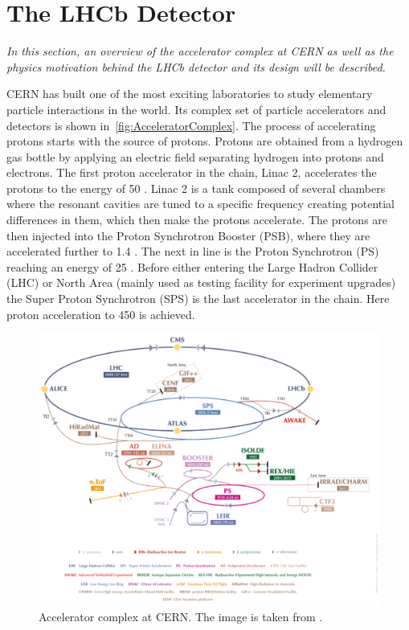 \chapter{The LHCb Detector}
\label{chap:dec}

\textit{In this section, an overview of the accelerator complex at CERN as well as the physics motivation behind the \Gls{LHCb} detector and its design will be described.}

CERN has built one of the most exciting laboratories to study elementary particle interactions in the world. Its complex set of particle accelerators and detectors is shown in~\autoref{fig:AcceleratorComplex}. The process of accelerating protons starts with the source of protons. Protons are obtained from a hydrogen gas bottle by applying an electric field separating hydrogen into protons and electrons. The first proton accelerator in the chain, Linac 2, accelerates the protons to the energy of 50 \mev. Linac 2 is a tank composed of several chambers where the resonant cavities are tuned to a specific frequency creating potential differences in them, which then make the protons accelerate. The protons are then injected into the Proton Synchrotron Booster (\Gls{PSB}), where they are accelerated further to 1.4 \gev. The next in line is the Proton Synchrotron (\Gls{PS}) reaching an energy of 25 \gev. Before either entering the Large Hadron Collider (\Gls{LHC}) or North Area (mainly used as testing facility for experiment upgrades) the Super Proton Synchrotron (\Gls{SPS}) is the last accelerator in the chain. Here proton acceleration to 450 \gev is achieved.

\begin{figure}
  \centering
  \includegraphics[width=1.0\linewidth]{figs/detector/AccComplexpng2pdf_cropped.pdf}
	\caption{Accelerator complex at CERN. The image is taken from \cite{complex}.}
  \label{fig:AcceleratorComplex}
\end{figure}

